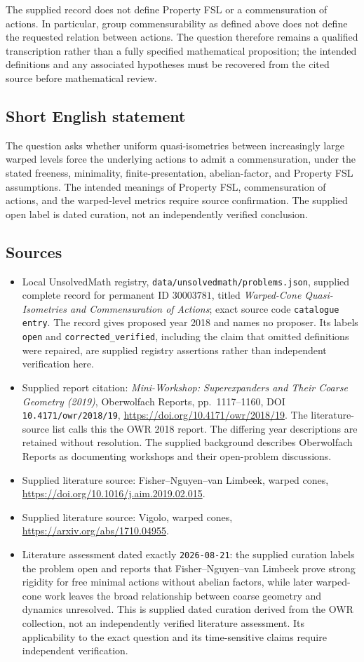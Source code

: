 \documentclass[11pt]{article}
\begin{document}
The supplied record does not define Property FSL or a commensuration of actions. In particular, group commensurability as defined above does not define the requested relation between actions. The question therefore remains a qualified transcription rather than a fully specified mathematical proposition; the intended definitions and any associated hypotheses must be recovered from the cited source before mathematical review.
\subsection{Short English statement}
The question asks whether uniform quasi-isometries between increasingly large warped levels force the underlying actions to admit a commensuration, under the stated freeness, minimality, finite-presentation, abelian-factor, and Property FSL assumptions. The intended meanings of Property FSL, commensuration of actions, and the warped-level metrics require source confirmation. The supplied open label is dated curation, not an independently verified conclusion.
\subsection{Sources}
\begin{itemize}
\item Local UnsolvedMath registry, \texttt{data/unsolvedmath/problems.json}, supplied complete record for permanent ID \(30003781\), titled \emph{Warped-Cone Quasi-Isometries and Commensuration of Actions}; exact source code \texttt{catalogue entry}. The record gives proposed year 2018 and names no proposer. Its labels \texttt{open} and \texttt{corrected\_verified}, including the claim that omitted definitions were repaired, are supplied registry assertions rather than independent verification here.
\item Supplied report citation: \emph{Mini-Workshop: Superexpanders and Their Coarse Geometry (2019)}, Oberwolfach Reports, pp.\ 1117--1160, DOI \texttt{10.4171/owr/2018/19}, \url{https://doi.org/10.4171/owr/2018/19}. The literature-source list calls this the OWR 2018 report. The differing year descriptions are retained without resolution. The supplied background describes Oberwolfach Reports as documenting workshops and their open-problem discussions.
\item Supplied literature source: Fisher--Nguyen--van Limbeek, warped cones, \url{https://doi.org/10.1016/j.aim.2019.02.015}.
\item Supplied literature source: Vigolo, warped cones, \url{https://arxiv.org/abs/1710.04955}.
\item Literature assessment dated exactly \texttt{2026-08-21}: the supplied curation labels the problem open and reports that Fisher--Nguyen--van Limbeek prove strong rigidity for free minimal actions without abelian factors, while later warped-cone work leaves the broad relationship between coarse geometry and dynamics unresolved. This is supplied dated curation derived from the OWR collection, not an independently verified literature assessment. Its applicability to the exact question and its time-sensitive claims require independent verification.
\end{itemize}
\end{document}
